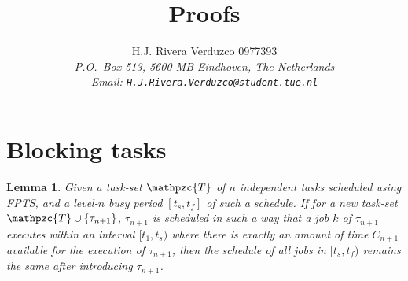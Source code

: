 \documentclass[fleqn]{article}
\title{\sf Proofs}
\author{{\sf H.J. Rivera Verduzco 0977393}\\
{\footnotesize\sl P.O.~Box 513, 5600 MB Eindhoven, The Netherlands}\\
{\footnotesize \sl Email: \tt H.J.Rivera.Verduzco@student.tue.nl}}
\newtheorem{lemma}{Lemma}
\begin{document}
\maketitle


\section{Blocking tasks}


\begin{lemma}
	Given a task-set $\mathpzc{T}$ of $n$ independent tasks scheduled using FPTS, and a level-$n$ busy period $[t_s,t_f]$ of such a schedule. If for a new task-set $\mathpzc{T} \cup \{\tau_{n+1}\}$, $\tau_{n+1}$ is scheduled in such a way that a job $k$ of $\tau_{n+1}$ executes within an interval $[t_1,t_s)$ where there is exactly an amount of time $C_{n+1}$ available for the execution of $\tau_{n+1}$, then the schedule of all jobs in $[t_s,t_f)$ remains the same after introducing $\tau_{n+1}$.
\end{lemma}
\end{document}
